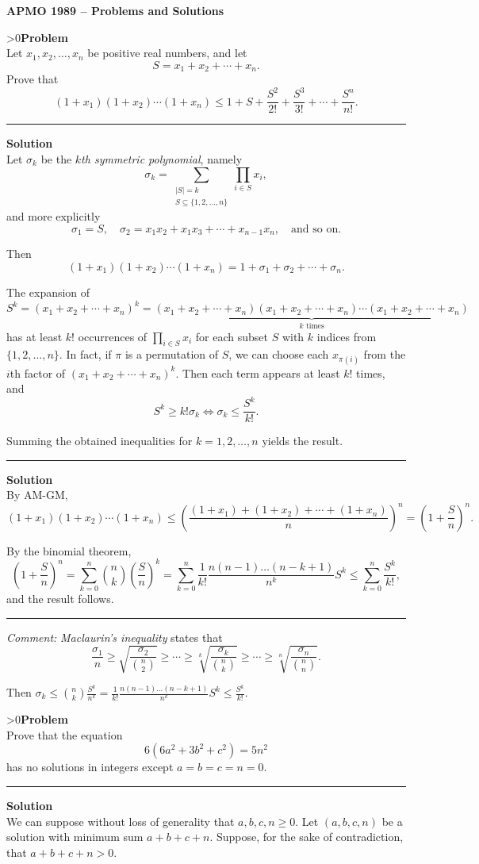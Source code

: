 \documentclass[12pt,oneside,a4paper]{book}
\newcounter{probnum}
\newcounter{solnum}
\newcommand{\prob}{\ifnum\value{probnum}>0\newpage\fi\setcounter{solnum}{0}\stepcounter{probnum}\textbf{Problem \theprobnum}\\}
\newcommand{\comment}{\medskip\hrule\medbreak\emph{Comment: }}
\newcommand{\sol}{\medskip\hrule\medbreak\textbf{Solution}\\}
\newcommand{\soln}{\stepcounter{solnum}\medskip\hrule\medbreak\textbf{Solution \thesolnum}\\}
\begin{document}
\begin{center}
\textbf{\large APMO 1989 -- Problems and Solutions}
\end{center}

\prob Let $x_1,x_2,\ldots,x_n$ be positive real numbers, and let
\[S=x_1+x_2+\cdots+x_n.\]
Prove that
\[(1+x_1)(1+x_2)\cdots(1+x_n)\le 1 + S + \frac{S^2}{2!} + \frac{S^3}{3!} + \cdots + \frac{S^n}{n!}.\]

\soln
Let $\sigma_k$ be the \emph{$k$th symmetric polynomial}, namely
\[\sigma_k = \sum_{\substack{|S|=k\\ S\subseteq\{1,2,\ldots,n\}}}\prod_{i\in S}x_i,\]
and more explicitly
\[\sigma_1 = S,\quad \sigma_2 = x_1x_2 + x_1x_3 + \cdots + x_{n-1}x_n,\quad \text{and so on.}\]

Then
\[(1+x_1)(1+x_2)\cdots(1+x_n) = 1 + \sigma_1 + \sigma_2 + \cdots + \sigma_n.\]

The expansion of
\[S^k = (x_1+x_2+\cdots+x_n)^k = \underbrace{(x_1+x_2+\cdots+x_n)(x_1+x_2+\cdots+x_n)\cdots (x_1+x_2+\cdots+x_n)}_{k\text{ times}}\]
has at least $k!$ occurrences of $\prod_{i\in S}x_i$ for each subset $S$ with $k$ indices from $\{1,2,\ldots,n\}$. In fact, if $\pi$ is a permutation of $S$, we can choose each $x_{\pi(i)}$ from the $i$th factor of $(x_1+x_2+\cdots+x_n)^k$. Then each term appears at least $k!$ times, and
\[S^k \ge k!\sigma_k\iff \sigma_k \le \frac{S^k}{k!}.\]

Summing the obtained inequalities for $k=1,2,\ldots,n$ yields the result.

\soln
By AM-GM,
\[(1+x_1)(1+x_2)\cdots(1+x_n) \le \left(\frac{(1+x_1)+(1+x_2)+\cdots+(1+x_n)}n\right)^n = \left(1+\frac Sn\right)^n.\]

By the binomial theorem,
\[\left(1+\frac Sn\right)^n = \sum_{k=0}^n\binom nk\left(\frac Sn\right)^k = \sum_{k=0}^n \frac1{k!}\frac{n(n-1)\ldots(n-k+1)}{n^k}S^k \le \sum_{k=0}^n\frac{S^k}{k!},\]
and the result follows.

\comment
\emph{Maclaurin's inequality} states that
\[\frac{\sigma_1}n \ge \sqrt{\frac{\sigma_2}{\binom n2}} \ge \cdots \ge \sqrt[k]{\frac{\sigma_k}{\binom nk}} \ge \cdots \ge \sqrt[n]{\frac{\sigma_n}{\binom nn}}.\]

Then $\sigma_k \le \binom nk\frac{S^k}{n^k} = \frac1{k!}\frac{n(n-1)\ldots(n-k+1)}{n^k}S^k \le \frac{S^k}{k!}$.

\prob Prove that the equation
\[6(6a^2+3b^2+c^2)=5n^2\]
has no solutions in integers except $a=b=c=n=0$.

\sol
We can suppose without loss of generality that $a,b,c,n\ge 0$. Let $(a,b,c,n)$ be a solution with minimum sum $a+b+c+n$. Suppose, for the sake of contradiction, that $a+b+c+n > 0$.
\end{document}
